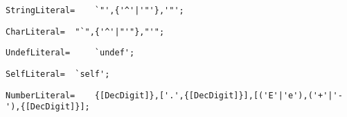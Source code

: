 \documentclass{article}
\begin{document}
    \begin{flushleft}
    \begin{lstlisting}[mathescape=true, breaklines=true]
      StringLiteral= 	`"',{'^'|'"'},'"';
    \end{lstlisting}
    \end{flushleft}
    \begin{flushleft}
    \begin{lstlisting}[mathescape=true, breaklines=true]
      CharLiteral= 	"`",{'^'|"'"},"'";
    \end{lstlisting}
    \end{flushleft}
    \begin{flushleft}
    \begin{lstlisting}[mathescape=true, breaklines=true]
      UndefLiteral= 	`undef';
    \end{lstlisting}
    \end{flushleft}
    \begin{flushleft}
    \begin{lstlisting}[mathescape=true, breaklines=true]
      SelfLiteral= 	`self';
    \end{lstlisting}
    \end{flushleft}
    \begin{flushleft}
    \begin{lstlisting}[mathescape=true, breaklines=true]
      NumberLiteral= 	{[DecDigit]},['.',{[DecDigit]}],[('E'|'e'),('+'|'-'),{[DecDigit]}];
    \end{lstlisting}
    \end{flushleft}
\end{document}
